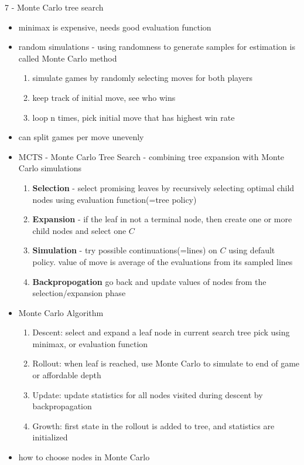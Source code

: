 \documentclass[11pt]{article}
\newcommand{\ee}[1]{\ensuremath{#1}}
\begin{document}
\begin{description}
\item 7 - Monte Carlo tree search
\begin{itemize}
	\item minimax is expensive, needs good evaluation function
	\item random simulations - using randomness to generate samples for estimation is called Monte Carlo method
	\begin{enumerate}
		\item simulate games by randomly selecting moves for both players
		\item keep track of initial move, see who wins
		\item loop n times, pick initial move that has highest win rate
	\end{enumerate}
	\item can split games per move unevenly
	\item MCTS - Monte Carlo Tree Search - combining tree expansion with Monte Carlo simulations
	\begin{enumerate}
		\item \textbf{Selection} - select promising leaves by recursively selecting optimal child nodes using evaluation function(=tree policy)
		\item \textbf{Expansion} - if the leaf in not a terminal node, then create one or more child nodes and select one \ee{C}
		\item \textbf{Simulation} - try possible continuations(=lines) on \ee{C} using default policy. value of move is average of the evaluations from its sampled lines
		\item \textbf{Backpropogation} go back and update values of nodes from the selection/expansion phase
	\end{enumerate}
	\item Monte Carlo Algorithm
	\begin{enumerate}
		\item Descent: select and expand a leaf node in current search tree
		\subitem pick using minimax, or evaluation function
		\item Rollout: when leaf is reached, use Monte Carlo to simulate to end of game or affordable depth
		\item Update: update statistics for all nodes visited during descent by backpropagation
		\item Growth: first state in the rollout is added to tree, and statistics are initialized
	\end{enumerate}
	\item how to choose nodes in Monte Carlo

\end{itemize}
\end{description}
\end{document}
